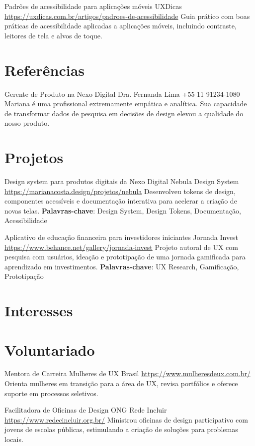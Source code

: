 \documentclass[a4paper, serif, 10pt]{moderncv}
\begin{document}
        {Padrões de acessibilidade para aplicações móveis}
        {UXDicas}
        {\url{https://uxdicas.com.br/artigos/padroes-de-acessibilidade}}
        {}
        {Guia prático com boas práticas de acessibilidade aplicadas a aplicações móveis, incluindo contraste, leitores de tela e alvos de toque.}
\section{Referências}

        {Gerente de Produto na Nexo Digital}
        {Dra. Fernanda Lima}
        {+55 11 91234-1080}
        {}
        {Mariana é uma profissional extremamente empática e analítica. Sua capacidade de transformar dados de pesquisa em decisões de design elevou a qualidade do nosso produto.}
\section{Projetos}

        {Design system para produtos digitais da Nexo Digital}
        {Nebula Design System}
        {\url{https://marianacosta.design/projetos/nebula}}
        {}
        {Desenvolveu tokens de design, componentes acessíveis e documentação interativa para acelerar a criação de novas telas.
\textbf{Palavras-chave}: Design System, Design Tokens, Documentação, Acessibilidade}

        {Aplicativo de educação financeira para investidores iniciantes}
        {Jornada Invest}
        {\url{https://www.behance.net/gallery/jornada-invest}}
        {}
        {Projeto autoral de UX com pesquisa com usuários, ideação e prototipação de uma jornada gamificada para aprendizado em investimentos.
\textbf{Palavras-chave}: UX Research, Gamificação, Prototipação}
\section{Interesses}

\section{Voluntariado}

        {Mentora de Carreira}
        {Mulheres de UX Brasil}
        {\url{https://www.mulheresdeux.com.br/}}
        {}
        {Orienta mulheres em transição para a área de UX, revisa portfólios e oferece suporte em processos seletivos.}


        {Facilitadora de Oficinas de Design}
        {ONG Rede Incluir}
        {\url{https://www.redecincluir.org.br/}}
        {}
        {Ministrou oficinas de design participativo com jovens de escolas públicas, estimulando a criação de soluções para problemas locais.}
\end{document}
